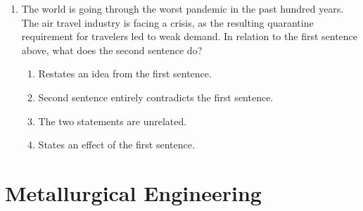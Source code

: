 \documentclass[journal]{IEEEtran}
\theoremstyle{remark}
\begin{document}
\begin{enumerate}
\item The world is going through the worst pandemic in the past hundred years. The air travel industry is facing a crisis, as the resulting quarantine requirement for travelers led to weak demand. In relation to the first sentence above, what does the second sentence do? \hfill{}
\begin{enumerate}
\item Restates an idea from the first sentence.
\item Second sentence entirely contradicts the first sentence.
\item The two statements are unrelated.
\item States an effect of the first sentence.
\end{enumerate}
\end{enumerate}

\section*{Metallurgical Engineering}
\end{document}
